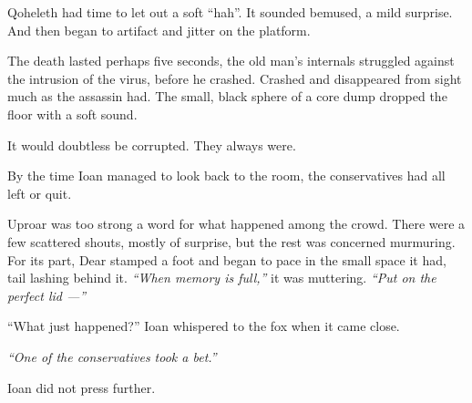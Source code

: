 Qoheleth had time to let out a soft ``hah''. It sounded bemused, a mild surprise. And then began to artifact and jitter on the platform.

The death lasted perhaps five seconds, the old man's internals struggled against the intrusion of the virus, before he crashed. Crashed and disappeared from sight much as the assassin had. The small, black sphere of a core dump dropped the floor with a soft sound.

It would doubtless be corrupted. They always were.

By the time Ioan managed to look back to the room, the conservatives had all left or quit.

Uproar was too strong a word for what happened among the crowd. There were a few scattered shouts, mostly of surprise, but the rest was concerned murmuring. For its part, Dear stamped a foot and began to pace in the small space it had, tail lashing behind it. \emph{``When memory is full,''} it was muttering. \emph{``Put on the perfect lid —''}

``What just happened?'' Ioan whispered to the fox when it came close.

\emph{``One of the conservatives took a bet.''}

Ioan did not press further.
